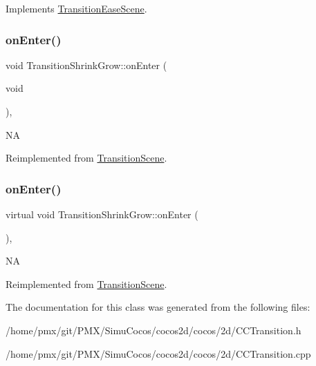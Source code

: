 Implements \hyperlink{classTransitionEaseScene_a6f27540600b0d703ed30adc8976e65df}{Transition\+Ease\+Scene}.

\mbox{\label{classTransitionShrinkGrow_a7ae52d07e1889121b706fbc6b1e7b6ff}} 
\subsubsection{\texorpdfstring{on\+Enter()}{onEnter()}\hspace{0.1cm}{\footnotesize\ttfamily [1/2]}}
{\footnotesize\ttfamily void Transition\+Shrink\+Grow\+::on\+Enter (\begin{DoxyParamCaption}\item[{void}]{ }\end{DoxyParamCaption})\hspace{0.3cm}{\ttfamily [override]}, {\ttfamily [virtual]}}

NA 

Reimplemented from \hyperlink{classTransitionScene_aace390a1bd8f3c73bb650a1e256a0f83}{Transition\+Scene}.

\mbox{\label{classTransitionShrinkGrow_af22969e16b81f0880e5ef6c768c88961}} 
\subsubsection{\texorpdfstring{on\+Enter()}{onEnter()}\hspace{0.1cm}{\footnotesize\ttfamily [2/2]}}
{\footnotesize\ttfamily virtual void Transition\+Shrink\+Grow\+::on\+Enter (\begin{DoxyParamCaption}{ }\end{DoxyParamCaption})\hspace{0.3cm}{\ttfamily [override]}, {\ttfamily [virtual]}}

NA 

Reimplemented from \hyperlink{classTransitionScene_aace390a1bd8f3c73bb650a1e256a0f83}{Transition\+Scene}.



The documentation for this class was generated from the following files\+:\begin{DoxyCompactItemize}
\item 
/home/pmx/git/\+P\+M\+X/\+Simu\+Cocos/cocos2d/cocos/2d/C\+C\+Transition.\+h\item 
/home/pmx/git/\+P\+M\+X/\+Simu\+Cocos/cocos2d/cocos/2d/C\+C\+Transition.\+cpp\end{DoxyCompactItemize}
